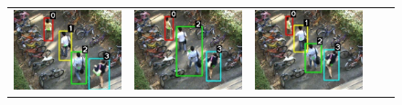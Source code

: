 \begin{figure}[t]
  \begin{center}
    \begin{tabular}{ccccc}
      \includegraphics[scale=0.21]{figures/complex-tracking-result-0125.pdf} &
      \includegraphics[scale=0.21]{figures/complex-tracking-result-0131.pdf} &
      \includegraphics[scale=0.21]{figures/complex-tracking-result-0133.pdf} &

\end{tabular}
\end{center}
\end{figure}
